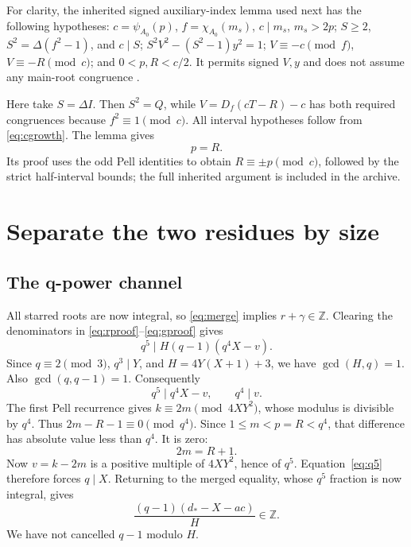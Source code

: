 \documentclass[11pt]{article}
\theoremstyle{remark}
\newcommand{\Z}{\mathbb Z}
\begin{document}
For clarity, the inherited signed auxiliary-index lemma used next has
the following hypotheses: $c=\psi_{A_0}(p)$,
$f=\chi_{A_0}(m_s)$, $c\mid m_s$, $m_s>2p$;
$S\ge2$, $S^2=\Delta(f^2-1)$, and $c\mid S$;
$S^2V^2-(S^2-1)y^2=1$;
$V\equiv-c\pmod f$, $V\equiv-R\pmod c$; and
$0<p,R<c/2$. It permits signed $V,y$ and does not assume any main-root
congruence \cite[lemmas on odd subsequences, signed index recovery, and
normalized rank]{carriers}.

Here take $S=\Delta I$. Then $S^2=Q$, while
$V=D_f(cT-R)-c$ has both required congruences because $f^2\equiv1\pmod c$.
All interval hypotheses follow from \eqref{eq:cgrowth}. The lemma gives
\begin{equation}\label{eq:pR}
 p=R.
\end{equation}
Its proof uses the odd Pell identities to obtain
$R\equiv\pm p\pmod c$, followed by the strict half-interval bounds;
the full inherited argument is included in the archive.

\section{Separate the two residues by size}\label{sec:residue}

\subsection{The q-power channel}
All starred roots are now integral, so \eqref{eq:merge} implies
$r+\gamma\in\Z$. Clearing the denominators in
\eqref{eq:rproof}--\eqref{eq:gproof} gives
\[
 q^5\mid H(q-1)(q^4X-v).
\]
Since $q\equiv2\pmod3$, $q^3\mid Y$, and $H=4Y(X+1)+3$,
we have $\gcd(H,q)=1$. Also $\gcd(q,q-1)=1$. Consequently
\begin{equation}\label{eq:q5}
 q^5\mid q^4X-v,
 \qquad q^4\mid v.
\end{equation}
The first Pell recurrence gives $k\equiv2m\pmod{4XY^2}$, whose modulus
is divisible by $q^4$. Thus $2m-R-1\equiv0\pmod{q^4}$.
Since $1\le m<p=R<q^4$, that difference has absolute value less than
$q^4$. It is zero:
\begin{equation}\label{eq:firstindex}
 2m=R+1.
\end{equation}
Now $v=k-2m$ is a positive multiple of $4XY^2$, hence of $q^5$.
Equation~\eqref{eq:q5} therefore forces $q\mid X$.
Returning to the merged equality, whose $q^5$ fraction is now integral,
gives
\begin{equation}\label{eq:weakH}
 \frac{(q-1)(d_*-X-ac)}H\in\Z.
\end{equation}
We have not cancelled $q-1$ modulo $H$.
\end{document}
